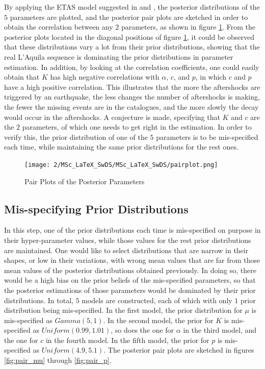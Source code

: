 \documentclass[11pt,twoside]{article}
\numberwithin{Theorem}{section}
\numberwithin{Definition}{section}
\numberwithin{Lemma}{section}
\numberwithin{Algorithm}{section}
\numberwithin{equation}{section}
\begin{document}
By applying the ETAS model suggested in \cite{naylor2023bayesian} and \cite{serafini2023approximation}, the posterior distributions of the $5$ parameters are plotted, and the posterior pair plots are sketched in order to obtain the correlation between any $2$ parameters, as shown in figure \ref{fig:pair}. From the posterior plots located in the diagonal positions of figure \ref{fig:pair}, it could be observed that these distributions vary a lot from their prior distributions, showing that the real L'Aquila sequence is dominating the prior distributions in parameter estimation. In addition, by looking at the correlation coefficients, one could easily obtain that $K$ has high negative correlations with $\alpha$, $c$, and $p$, in which $c$ and $p$ have a high positive correlation. This illustrates that the more the aftershocks are triggered by an earthquake, the less changes the number of aftershocks is making, the fewer the missing events are in the catalogues, and the more slowly the decay would occur in the aftershocks. A conjecture is made, specifying that $K$ and $c$ are the $2$ parameters, of which one needs to get right in the estimation. In order to verify this, the prior distribution of one of the $5$ parameters is to be mis-specified each time, while maintaining the same prior distributions for the rest ones.
\begin{figure}[h]
\centering
\texttt{[image: 2/MSc\_LaTeX\_SwDS/MSc\_LaTeX\_SwDS/pairplot.png]}
\caption{Pair Plots of the Posterior Parameters}
\label{fig:pair}
\end{figure}
\subsection{Mis-specifying Prior Distributions}
In this step, one of the prior distributions each time is mis-specified on purpose in their hyper-parameter values, while those values for the rest prior distributions are maintained. One would like to select distributions that are narrow in their shapes, or low in their variations, with wrong mean values that are far from those mean values of the posterior distributions obtained previously. In doing so, there would be a high bias on the prior beliefs of the mis-specified parameters, so that the posterior estimations of those parameters would be dominated by their prior distributions. In total, $5$ models are constructed, each of which with only $1$ prior distribution being mis-specified. In the first model, the prior distribution for $\mu$ is mis-specified as $Gamma(5,1)$. In the second model, the prior for $K$ is mis-specified as $Uniform(0.99,1.01)$, so does the one for $\alpha$ in the third model, and the one for $c$ in the fourth model. In the fifth model, the prior for $p$ is mis-specified as $Uniform(4.9,5.1)$. The posterior pair plots are sketched in figures \ref{fig:pair_mu} through \ref{fig:pair_p}.
\end{document}

